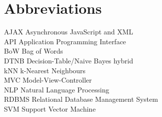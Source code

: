 \chapter*{Abbreviations}

\begin{flushleft}

AJAX \hfill Asynchronous JavaScript and XML \\
API \hfill Application Programming Interface \\
BoW \hfill Bag of Words \\
DTNB \hfill Decision-Table/Naive Bayes hybrid \\
kNN \hfill k-Nearest Neighbours \\
MVC \hfill Model-View-Controller \\
NLP \hfill  Natural Language Processing \\
RDBMS \hfill Relational Database Management System \\
SVM \hfill Support Vector Machine \\

\end{flushleft}